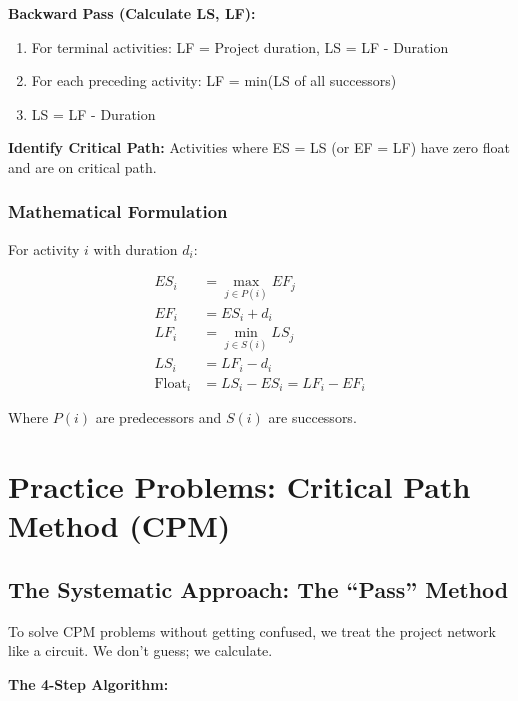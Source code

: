 \documentclass[
  letterpaper,
  DIV=11,
  numbers=noendperiod]{scrreprt}
\providecommand{\tightlist}{%
  \setlength{\itemsep}{0pt}\setlength{\parskip}{0pt}}
\begin{document}
\textbf{Backward Pass (Calculate LS, LF):}

\begin{enumerate}
\def\labelenumi{\arabic{enumi}.}
\tightlist
\item
  For terminal activities: LF = Project duration, LS = LF - Duration
\item
  For each preceding activity: LF = min(LS of all successors)
\item
  LS = LF - Duration
\end{enumerate}

\textbf{Identify Critical Path:} Activities where ES = LS (or EF = LF)
have zero float and are on critical path.

\subsubsection{Mathematical
Formulation}\label{mathematical-formulation-2}

For activity \(i\) with duration \(d_i\):

\[
\begin{aligned}
ES_i &= \max_{j \in P(i)} EF_j \\
EF_i &= ES_i + d_i \\
LF_i &= \min_{j \in S(i)} LS_j \\
LS_i &= LF_i - d_i \\
\text{Float}_i &= LS_i - ES_i = LF_i - EF_i
\end{aligned}
\]

Where \(P(i)\) are predecessors and \(S(i)\) are successors.

\section{Practice Problems: Critical Path Method
(CPM)}\label{practice-problems-critical-path-method-cpm}

\subsection{The Systematic Approach: The ``Pass''
Method}\label{the-systematic-approach-the-pass-method}

To solve CPM problems without getting confused, we treat the project
network like a circuit. We don't guess; we calculate.

\textbf{The 4-Step Algorithm:}
\end{document}
